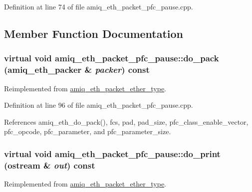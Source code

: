 Definition at line 74 of file amiq\_\-eth\_\-packet\_\-pfc\_\-pause.cpp.

\subsection{Member Function Documentation}
\hypertarget{classamiq__eth__packet__pfc__pause_ac06dfc3d16b73113bbd42460ddbc9c4b}{
\subsubsection[{do\_\-pack}]{\setlength{\rightskip}{0pt plus 5cm}virtual void amiq\_\-eth\_\-packet\_\-pfc\_\-pause::do\_\-pack ({\bf amiq\_\-eth\_\-packer} \& {\em packer}) const}}
\label{classamiq__eth__packet__pfc__pause_ac06dfc3d16b73113bbd42460ddbc9c4b}


Reimplemented from \hyperlink{classamiq__eth__packet__ether__type_a62fe5f26a466f0bd0045599b89aa6926}{amiq\_\-eth\_\-packet\_\-ether\_\-type}.

Definition at line 96 of file amiq\_\-eth\_\-packet\_\-pfc\_\-pause.cpp.

References amiq\_\-eth\_\-do\_\-pack(), fcs, pad, pad\_\-size, pfc\_\-class\_\-enable\_\-vector, pfc\_\-opcode, pfc\_\-parameter, and pfc\_\-parameter\_\-size.\hypertarget{classamiq__eth__packet__pfc__pause_a58c67ea445a72bc6c1c584625d642899}{
\subsubsection[{do\_\-print}]{\setlength{\rightskip}{0pt plus 5cm}virtual void amiq\_\-eth\_\-packet\_\-pfc\_\-pause::do\_\-print (ostream \& {\em out}) const}}
\label{classamiq__eth__packet__pfc__pause_a58c67ea445a72bc6c1c584625d642899}


Reimplemented from \hyperlink{classamiq__eth__packet__ether__type_a9b2852fa1aaf278138fde2232e446f63}{amiq\_\-eth\_\-packet\_\-ether\_\-type}.

